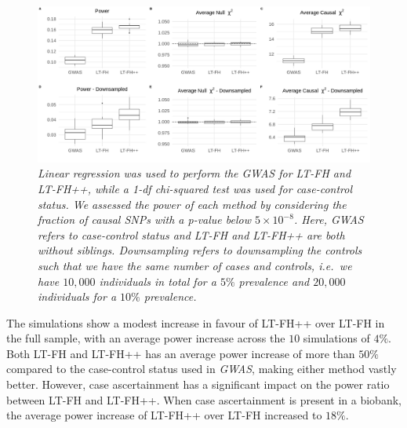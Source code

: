 \begin{figure}[h]
	\includegraphics[width=\textwidth]{results/boxplot_05prev_both.png}
	\caption[Simulation results for a $ 5\% $ prevalence, with and without downsampling of controls]{
		\sl Linear regression was used to perform the GWAS for LT-FH and LT-FH++, while a 1-df chi-squared test was used for case-control status. We assessed the power of each method by considering the fraction of causal SNPs with a p-value below $ 5 \times 10^{-8} $. Here, GWAS refers to case-control status and LT-FH and LT-FH++ are both without siblings. Downsampling refers to downsampling the controls such that we have the same number of cases and controls, i.e.\, we have $ 10,000 $ individuals in total for a $ 5\% $ prevalence and $ 20,000 $ individuals for a $ 10\% $ prevalence.}
	\label{fig:LTFHppSimulationResults}
\end{figure}

The simulations show a modest increase in favour of LT-FH++ over LT-FH in the full sample, with an average power increase across the $ 10 $ simulations of $ 4\% $. Both LT-FH and LT-FH++ has an average power increase of more than $ 50\% $ compared to the case-control status used in \textit{GWAS}, making either method vastly better. However, case ascertainment has a significant impact on the power ratio between LT-FH and LT-FH++. When case ascertainment is present in a biobank, the average power increase of LT-FH++ over LT-FH increased to $ 18\% $.

\newpage

